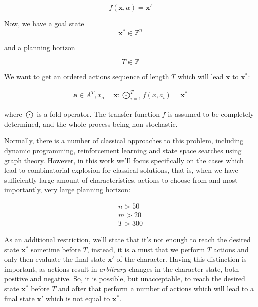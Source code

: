 \documentclass[11pt, a4paper]{article}
\begin{document}
	\begin{equation}
		f(\mathbf{x}, a) = \mathbf{x}'
	\end{equation}

	Now, we have a goal state 
	\begin{equation}
		\mathbf{x}^* \in \mathbb{Z}^n
	\end{equation} 
	
	and a planning horizon
	
	\begin{equation}
		T \in \mathbb{Z}
	\end{equation}

	We want to get an ordered actions sequence of length $T$ which will lead $\mathbf{x}$ to $\mathbf{x}^*$:
	
	\begin{eqnarray}
		\mathbf{a} \in A^T, x_o = \mathbf{x}: \bigodot_{i=1}^{T} f(x, a_i) = \mathbf{x}^*
	\end{eqnarray}
	
	where $\bigodot$ is a fold operator.
	The transfer function $f$ is assumed to be completely determined, and the whole process being non-stochastic.
		
	Normally, there is a number of classical approaches to this problem, including dynamic programming, reinforcement learning and state space searches using graph theory.
	However, in this work we'll focus specifically on the cases which lead to combinatorial explosion for classical solutions, that is, when we have sufficiently large amount of characteristics, actions to choose from and most importantly, very large planning horizon:
	
	\begin{eqnarray}
		n > 50 \\
		m > 20 \\
		T > 300
	\end{eqnarray}
	
	As an additional restriction, we'll state that it's not enough to reach the desired state $\mathbf{x}^*$ sometime before $T$, instead, it is a must that we perform $T$ actions and only then evaluate the final state $\mathbf{x}'$ of the character.
	Having this distinction is important, as actions result in \textit{arbitrary} changes in the character state, both positive and negative.
	So, it is possible, but unacceptable, to reach the desired state $\mathbf{x}^*$ before $T$ and after that perform a number of actions which will lead to a final state $\mathbf{x}'$ which is not equal to $\mathbf{x}^*$.
\end{document}
